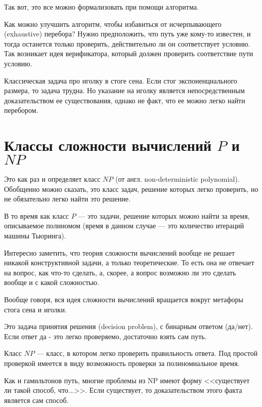 \documentclass{article}
\begin{document}
Так вот, это все можно формализовать при помощи алгоритма.


Как можно улучшить алгоритм, чтобы избавиться от исчерпывающего (exhaustive) перебора? Нужно предположить, что путь уже кому-то известен, и тогда останется только проверить, действительно ли он соответствует условию. Так возникает идея верификатора, который должен проверить соответствие пути условию.

Классическая задача про иголку в стоге сена. Если стог экспоненциального размера, то задача трудна.  
Но указание на иголку является непосредственным доказательством ее существования, однако не факт, что ее можно легко найти перебором. 


\section{Классы сложности вычислений $P$ и $NP$}

Это как раз и определяет класс $NP$ (от англ. non-deterministic polynomial). Обобщенно можно сказать, это класс задач, решение которых легко проверить, но не обязательно легко найти это решение.

В то время как класс $P$ --- это задачи, решение которых можно найти за время, описываемое полиномом (время в данном случае --- это количество итераций машины Тьюринга).

Интересно заметить, что теория сложности вычислений вообще не решает никакой конструктивной задачи, а только теоретические. То есть она не отвечает на вопрос, как что-то сделать, а, скорее, а вопрос возможно ли это сделать вообще и с какой сложностью.

Вообще говоря, вся идея сложности вычислений вращается вокруг метафоры стога сена и иголки.

Это задача принятия решения (decision problem), с бинарным ответом (да/нет).
Если ответ да - это легко проверяемо, достаточно взять сам путь.

Класс $NP$ --- класс, в котором легко проверить правильность ответа. Под простой проверкой имеется в виду возможность проверки за полиномиальное время.

Как и гамильтонов путь, многие проблемы из NP имеют форму <<существует ли такой способ, что...>>. Если существует, то доказательством этого факта является сам способ.
\end{document}
